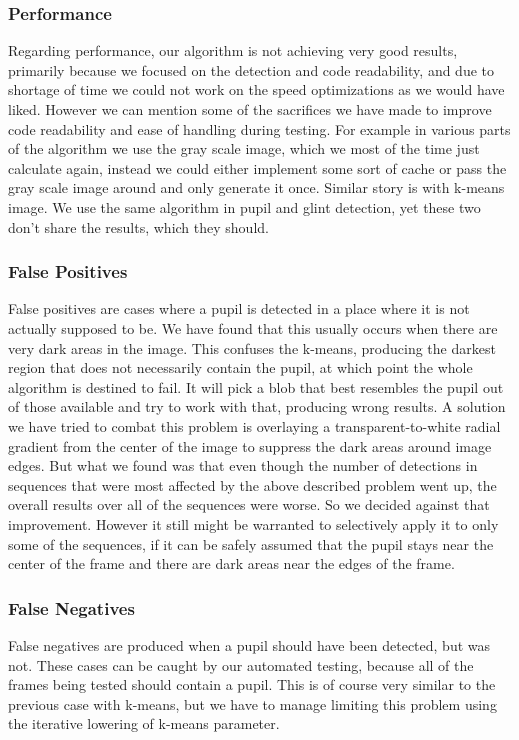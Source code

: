 \subsubsection{Performance}
Regarding performance, our algorithm is not achieving very good results, primarily because we focused on the detection and code readability, and due to shortage of time we could not work on the speed optimizations as we would have liked. However we can mention some of the sacrifices we have made to improve code readability and ease of handling during testing. 
For example in various parts of the algorithm we use the gray scale image, which we most of the time just calculate again, instead we could either implement some sort of cache or pass the gray scale image around and only generate it once. Similar story is with k-means image. We use the same algorithm in pupil and glint detection, yet these two don’t share the results, which they should.

\subsubsection{False Positives}
False positives are cases where a pupil is detected in a place where it is not actually supposed to be. We have found that this usually occurs when there are very dark areas in the image. This confuses the k-means, producing the darkest region that does not necessarily contain the pupil, at which point the whole algorithm is destined to fail. It will pick a blob that best resembles the pupil out of those available and try to work with that, producing wrong results. 
A solution we have tried to combat this problem is overlaying a transparent-to-white radial gradient from the center of the image to suppress the dark areas around image edges. But what we found was that even though the number of detections in sequences that were most affected by the above described problem went up, the overall results over all of the sequences were worse. So we decided against that improvement. However it still might be warranted to selectively apply it to only some of the sequences, if it can be safely assumed that the pupil stays near the center of the frame and there are dark areas near the edges of the frame.

\subsubsection{False Negatives}
False negatives are produced when a pupil should have been detected, but was not. These cases can be caught by our automated testing, because all of the frames being tested should contain a pupil. This is of course very similar to the previous case with k-means, but we have to manage limiting this problem using the iterative lowering of k-means parameter.
